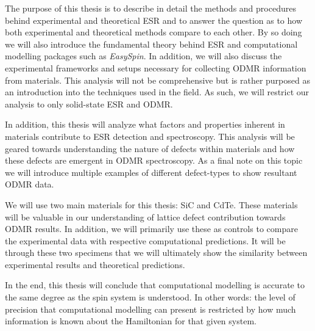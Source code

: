 \documentclass[oneside, astronomy, noacknowlegments]{BYUPhys}
\begin{document}
The purpose of this thesis is to describe in detail the methods and procedures behind experimental and theoretical ESR and to answer the question as to how both experimental and theoretical methods compare to each other. By so doing we will also introduce the fundamental theory behind ESR and computational modelling packages such as \textit{EasySpin}. In addition, we will also discuss the experimental frameworks and setups necessary for collecting ODMR information from materials. This analysis will not be comprehensive but is rather purposed as an introduction into the techniques used in the field. As such, we will restrict our analysis to only solid-state ESR and ODMR.

In addition, this thesis will analyze what factors and properties inherent in materials contribute to ESR detection and spectroscopy. This analysis will be geared towards understanding the nature of defects within materials and how these defects are emergent in ODMR spectroscopy. As a final note on this topic we will introduce multiple examples of different defect-types to show resultant ODMR data.

We will use two main materials for this thesis: SiC and CdTe. These materials will be valuable in our understanding of lattice defect contribution towards ODMR results. In addition, we will primarily use these as controls to compare the experimental data with respective computational predictions. It will be through these two specimens that we will ultimately show the similarity between experimental results and theoretical predictions.

In the end, this thesis will conclude that computational modelling is accurate to the same degree as the spin system is understood. In other words: the level of precision that computational modelling can present is restricted by how much information is known about the Hamiltonian for that given system.
\end{document}
